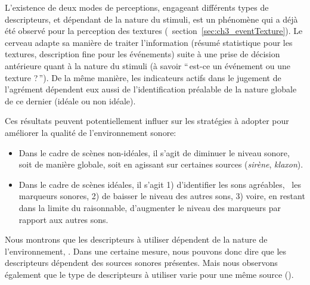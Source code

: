 L'existence de deux modes de perceptions, engageant  différents types de descripteurs, et dépendant de la nature du stimuli, est un phénomène qui a déjà été observé pour la perception des textures (\cf~section~\ref{sec:ch3_eventTexture}). Le cerveau adapte sa manière de traiter l'information (résumé statistique pour les textures, description fine pour les événements) suite à une prise de décision antérieure quant à la nature du stimuli (à savoir ``\,est-ce un événement ou une texture ?\,''). De la même manière, les indicateurs actifs dans le jugement de l'agrément dépendent eux aussi de l'identification préalable de la nature globale de ce dernier  (idéale ou non idéale).

Ces résultats peuvent potentiellement influer sur les stratégies à adopter pour améliorer la qualité de l’environnement sonore:

\begin{itemize}
\item Dans le cadre de scènes non-idéales, il s'agit de diminuer le niveau sonore, soit de manière globale, soit en agissant sur certaines sources (\emph{sirène}, \emph{klaxon}). 
\item Dans le cadre de scènes idéales, il s'agit 1) d'identifier les sons agréables, \ie~les marqueurs sonores, 2) de baisser le niveau des autres sons, 3) voire, en restant dans la limite du raisonnable, d'augmenter le niveau des marqueurs par rapport aux autres sons.
\end{itemize}

Nous montrons que les descripteurs à utiliser dépendent de la nature de l'environnement,  . Dans une certaine mesure, nous pouvons donc dire que les descripteurs dépendent des sources sonores présentes. Mais nous observons également que le type de descripteurs à utiliser varie pour une même source   (). \\


